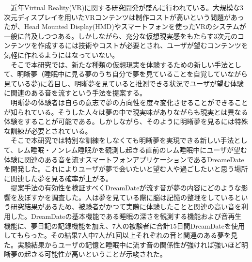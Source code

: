 
\begin{jabstract}
　近年Virtual Reality(VR)に関する研究開発が盛んに行われている。大規模な3次元ディスプレイを用いたVRコンテンツは制作コストが高いという問題があったが、Head Mounted Display(HMD)やスマートフォンを使ったVRのシステムが一般に普及しつつある。しかしながら、充分な仮想現実感をもたらす3次元のコンテンツを作成するには技術やコストが必要とされ、ユーザが望むコンテンツを気軽に作れるようにはなっていない。\\
　そこで本研究では、新たな種類の仮想現実を体験するための新しい手法として、明晰夢（睡眠中に見る夢のうち自分で夢を見ていることを自覚していながら見ている夢)に着目し、明晰夢を見ていると推測できる状況でユーザが望む体験に関連のある音を流すという手法を提案する。\\
　明晰夢の体験者は自らの意志で夢の方向性を度々変化させることができることが知られている。そうした人々は夢の中で現実味がありながらも現実とは異なる体験をすることが可能である。しかしながら、そのように明晰夢を見るには特殊な訓練が必要とされている。 \\
　そこで本研究では特別な訓練をしなくても明晰夢を実現できる新しい手法として、レム睡眠・ノンレム睡眠かを観測し起きる直前のレム睡眠中にユーザが望む体験に関連のある音を流すスマートフォンアプリケーションであるDreameDateを開発した。これによりユーザが夢で会いたいと望む人や過ごしたいと思う場所に関連した夢を見る確率が上がる。\\
　提案手法の有効性を検証すべくDreamDateが流す音が夢の内容にどのような影響を及ぼすかを調査した。人は夢を見ている際に脳は記憶の整理をしているという研究結果があるため、被験者がかつて実際に体験したことと関連の高い音を利用した。DreamDateの基本機能である睡眠の深さを観測する機能および音再生機能に、夢日記の記録機能を加え、7人の被験者に合計15日間DreamDateを使用してもらった。その結果7人中7人が1回以上それぞれの音と関連のある夢を見た。実験結果からユーザの記憶と睡眠中に流す音の関係性が強ければ強いほど明晰夢の起きる可能性が高いということが示唆された。

\end{jabstract}


